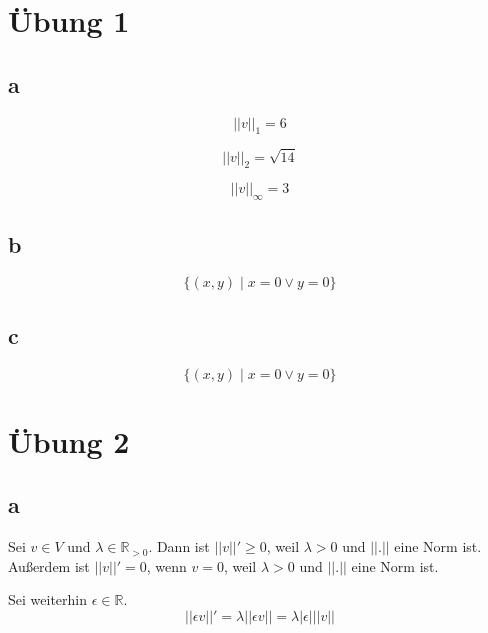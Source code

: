 \documentclass[10pt,a4paper]{article}
\begin{document}
\section*{Übung 1}

\subsection*{a}

\begin{equation}
||v||_{1} = 6
\end{equation}

\begin{equation}
||v||_{2} = \sqrt{14}
\end{equation}

\begin{equation}
||v||_{\infty} = 3
\end{equation}

\subsection*{b}

\begin{equation}
\{ (x,y) \mid x = 0 \lor y = 0 \}
\end{equation}

\subsection*{c}

\begin{equation}
\{ (x,y) \mid x = 0 \lor y = 0 \}
\end{equation}

\section*{Übung 2}

\subsection*{a}

Sei $v \in V$ und $\lambda \in \mathbb{R}_{> 0}$.
Dann ist $||v||' \ge 0$, weil $\lambda > 0$ und $||.||$ eine Norm ist.
Außerdem ist $||v||' = 0$, wenn $v = 0$, weil $\lambda > 0$ und $||.||$ eine Norm ist.

Sei weiterhin $\epsilon \in \mathbb{R}$.
\begin{equation}
||\epsilon v||' = \lambda ||\epsilon v|| = \lambda |\epsilon| ||v||
\end{equation}
\end{document}
